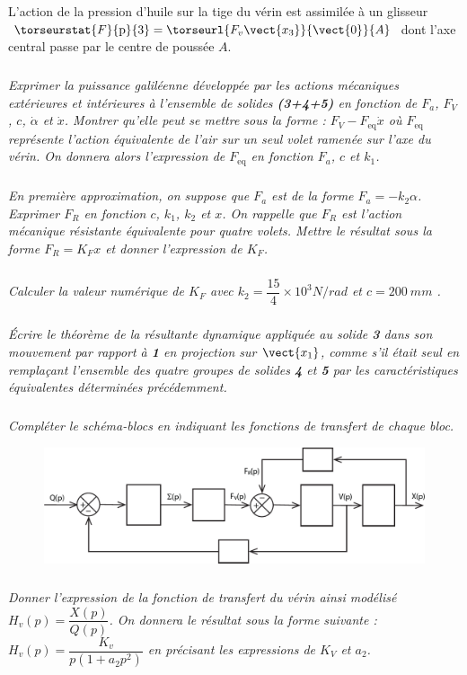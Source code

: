 \documentclass[10pt,fleqn]{article} %
\begin{document}
L'action de la pression d'huile sur la tige du vérin est assimilée à un glisseur 
$\torseurstat{F}{\text{p}}{3} = \torseurl{F_v\vect{x_3}}{\vect{0}}{A}$ dont l'axe central passe par le centre de poussée $A$.


\subparagraph{}\textit{Exprimer la puissance galiléenne développée par les actions mécaniques extérieures et intérieures à l'ensemble de solides \textbf{(3+4+5)} en fonction de $F_a$, $F_V$, $c$, $\dot{\alpha}$ et  $\dot{x}$. Montrer qu'elle peut se mettre sous la forme : $F_V - F_{\text{eq}}\dot{x}$  où $F_{\text{eq}}$ représente l'action équivalente de l'air sur un seul volet ramenée sur l'axe du vérin. On donnera alors l'expression de $F_{\text{eq}}$ en fonction $F_a$, $c$ et $k_1$.}

\subparagraph{}\textit{En première approximation, on suppose que $F_a$ est de la forme $F_a = -k_2 \alpha$. Exprimer $F_R$ en fonction $c$, $k_1$, $k_2$ et $x$. On rappelle que $F_R$ est l'action mécanique résistante équivalente pour quatre volets. Mettre le résultat sous la forme $F_R = K_F x$  et donner l'expression de $K_F$.}

\subparagraph{}\textit{Calculer la valeur numérique de $K_F$ avec $k_2 = \dfrac{15}{4} \times 10^3 \si{N/rad}$ et $c=\SI{200}{mm}$ .}

\subparagraph{}\textit{Écrire le théorème de la résultante dynamique appliquée au solide \textbf{3} dans son mouvement par rapport à \textbf{1} en projection sur $\vect{x_1}$, comme s'il était seul en remplaçant l'ensemble des quatre groupes de solides \textbf{4} et \textbf{5} par les caractéristiques équivalentes déterminées précédemment. }

\subparagraph{}\textit{Compléter le schéma-blocs en indiquant les fonctions de transfert de chaque bloc.}

\begin{figure}[H]
\centering
\includegraphics[width=.8\linewidth]{dr_Q27}
\end{figure}


\subparagraph{\label{q_28}}\textit{Donner l'expression de la fonction de transfert du vérin ainsi modélisé $H_v(p)=\dfrac{X(p)}{Q(p)}$. On donnera le résultat sous la forme suivante : $H_v(p)=\dfrac{K_v}{p\left(1+a_2 p^2\right)}$  en précisant les expressions de $K_V$ et $a_2$.}
\end{document}
